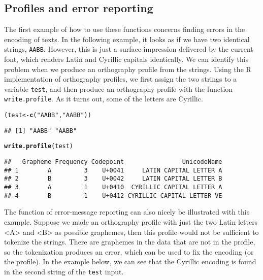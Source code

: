 \documentclass[output=book,nonflat,modfonts,
citecolor=brown,
		]{langsci/langscibook}\usepackage[]{graphicx}\usepackage[]{color}
\makeatletter
\newcommand{\hlstr}[1]{\textcolor[rgb]{0.192,0.494,0.8}{#1}}%
\newcommand{\hlstd}[1]{\textcolor[rgb]{0.345,0.345,0.345}{#1}}%
\newcommand{\hlkwb}[1]{\textcolor[rgb]{0.69,0.353,0.396}{#1}}%
\newcommand{\hlkwd}[1]{\textcolor[rgb]{0.737,0.353,0.396}{\textbf{#1}}}%
\newenvironment{kframe}{%
 \def\at@end@of@kframe{}%
 \ifinner\ifhmode%
  \def\at@end@of@kframe{\end{minipage}}%
  \begin{minipage}{\columnwidth}%
 \fi\fi%
 \def\FrameCommand##1{\hskip\@totalleftmargin \hskip-\fboxsep
 \colorbox{shadecolor}{##1}\hskip-\fboxsep
     \hskip-\linewidth \hskip-\@totalleftmargin \hskip\columnwidth}%
 \MakeFramed {\advance\hsize-\width
   \@totalleftmargin\z@ \linewidth\hsize
   \@setminipage}}%
 {\par\unskip\endMakeFramed%
 \at@end@of@kframe}
\newenvironment{knitrout}{}{} %
\makeatother
\begin{document}



\subsection*{Profiles and error reporting}
\label{error-reporting}

The first example of how to use these functions concerns finding errors in the
encoding of texts. In the following example, it looks as if we have two
identical strings, \texttt{AABB}. However, this is just a surface-impression
delivered by the current font, which renders Latin and Cyrillic capitals
identically. We can identify this problem when we produce an orthography profile
from the strings. Using the R implementation of orthography profiles, we
first assign the two strings to a variable \texttt{test}, and then produce an
orthography profile with the function \texttt{write.profile}. As it turns out,
some of the letters are Cyrillic.

\begin{knitrout}\footnotesize
{}\color{fgcolor}\begin{kframe}
\begin{alltt}
\hlstd{(test} \hlkwb{<-} \hlkwd{c}\hlstd{(}\hlstr{"AABB"}\hlstd{,} \hlstr{"AАBВ"}\hlstd{))}
\end{alltt}
\begin{verbatim}
## [1] "AABB" "AАBВ"
\end{verbatim}
\begin{alltt}
\hlkwd{write.profile}\hlstd{(test)}
\end{alltt}
\begin{verbatim}
##   Grapheme Frequency Codepoint                UnicodeName
## 1        A         3    U+0041     LATIN CAPITAL LETTER A
## 2        B         3    U+0042     LATIN CAPITAL LETTER B
## 3        А         1    U+0410  CYRILLIC CAPITAL LETTER A
## 4        В         1    U+0412 CYRILLIC CAPITAL LETTER VE
\end{verbatim}
\end{kframe}
\end{knitrout}

The function of error-message reporting can also nicely be illustrated
with this example. Suppose we made an orthography profile with just the two
Latin letters <A> and <B> as possible graphemes, then this profile would not be
sufficient to tokenize the strings. There are graphemes in the data that are not
in the profile, so the tokenization produces an error, which can be used to fix
the encoding (or the profile). In the example below, we can see that the
Cyrillic encoding is found in the second string of the \texttt{test} input.
\end{document}
